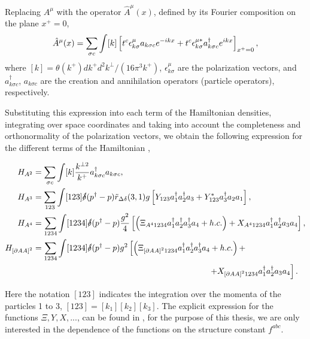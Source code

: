 \documentclass[11pt,a4paper,twoside,pdf]{article}
\numberwithin{equation}{section}
\begin{document}
Replacing $A^\mu$ with the operator $\hat{A}^\mu(x)$, defined by its Fourier composition
on the plane $x^+=0$,
\begin{equation}
    \hat{A}^\mu(x) = \sum _{\sigma c} \int [k] \left[ t^c \epsilon^\mu_{k \sigma} 
    a_{k\sigma c}  e^{-ikx} + t^c \epsilon^{\mu*}_{k \sigma} 
    a^\dagger_{k\sigma c}  e^{ikx} \right]_{x^+=0},
\end{equation}
where $[k] = \theta(k^+) dk^+ d^2k^\perp / (16\pi^3k^+)$, $\epsilon^\mu_{k \sigma}$ 
are the polarization vectors, and $a^\dagger_{k\sigma c}$, $a_{k\sigma c}$ are the 
creation and annihilation operators (particle operators), respectively. 


Substituting this expression into each term of the Hamiltonian densities, integrating
over space coordinates and taking into account the completeness and orthonormality 
of the polarization vectors, we obtain the following expression for the different
terms of the Hamiltonian \cite{QCDG}, 

\begin{align}
    H_{A^2} &= \sum_{\sigma c} \int [k] \frac{k^{\perp 2}}{k^+}a^\dagger_{k\sigma c}
    a_{k\sigma c}, \label{eq:H_A^2}\\
    H_{A^3} &= \sum_{123} \int [123] \slashed{\delta}(p^\dagger - p) \tilde{r}_{\Delta \delta}
    (3, 1) g\sbrackets{Y_{123}a_1^\dagger a_2^\dagger a_3 + Y_{123}^*a_3^\dagger a_2 a_1},
    \label{eq:H_A^3}\\
    H_{A^4} &= \sum_{1234} \int [1234] \slashed{\delta}(p^\dagger - p) \frac{g^2}{4}
    \sbrackets{\parenthesis{\Xi_{A^4 1234} a_1^\dagger a_2^\dagger a_3^\dagger a_4 + h.c.}+ X_{A^4 1234} 
    a_1^\dagger a_2^\dagger a_3 a_4 }, \label{eq:H_A^4}\\
    H_{\sbrackets{\partial A A}^2} &= \sum_{1234} \int [1234] \slashed{\delta}
    (p^\dagger - p) g^2 \left[\parenthesis{\Xi_{\sbrackets{\partial A A}^2 1234}
    a_1^\dagger a_2^\dagger a_3^\dagger a_4 + h.c.}+\right.\nonumber \\
    &\left. \hspace{7.5cm} + X_{\sbrackets{\partial A A}^2 
    1234} a_1^\dagger a_2^\dagger a_3 a_4 \right] \label{eq:H_partial}.
\end{align}

Here the notation $[123]$ indicates the integration over the momenta of
the particles 1 to 3, $[123] = [k_1][k_2][k_3]$. The explicit expression for the 
functions $\Xi, Y, X, ...$, can be found in \cite{QCDG}, for 
the purpose of this thesis, we are only interested in the dependence of the functions 
on the structure constant $f^{abc}$. 
\end{document}
